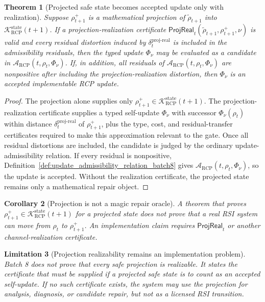 \documentclass[11pt]{article}
\newtheorem{theorem}{Theorem}[section]
\newtheorem{corollary}[theorem]{Corollary}
\newtheorem{limitation}[theorem]{Limitation}
\newcommand{\K}{\mathcal{K}}
\newcommand{\Acal}{\mathcal{A}}
\newcommand{\1}{\mathbf{1}}
\newcommand{\RCP}{\mathrm{RCP}}
\newcommand{\state}{\mathrm{state}}
\providecommand{\proj}{\mathrm{proj}}
\providecommand{\real}{\mathrm{real}}
\begin{document}
\begin{theorem}[Projected safe state becomes accepted update only with realization]
\label{thm:projection_realization_accepted_update_batch8}
Suppose \(\rho_{t+1}^+\) is a mathematical projection of \(\widetilde\rho_{t+1}\) into \(\K_{\RCP}^{\state}(t+1)\). If a projection-realization certificate \(\mathsf{ProjReal}_t(\widetilde\rho_{t+1},\rho_{t+1}^+,\nu)\) is valid and every residual distortion induced by \(\delta_t^{\proj\mbox{-}\real}\) is included in the admissibility residuals, then the typed update \(\Phi_\nu\) may be evaluated as a candidate in \(\Acal_{\RCP}(t,\rho_t,\Phi_\nu)\). If, in addition, all residuals of \(\Acal_{\RCP}(t,\rho_t,\Phi_\nu)\) are nonpositive after including the projection-realization distortion, then \(\Phi_\nu\) is an accepted implementable RCP update.
\end{theorem}

\begin{proof}
The projection alone supplies only \(\rho_{t+1}^+\in\K_{\RCP}^{\state}(t+1)\). The projection-realization certificate supplies a typed self-update \(\Phi_\nu\) with successor \(\Phi_\nu(\rho_t)\) within distance \(\delta_t^{\proj\mbox{-}\real}\) of \(\rho_{t+1}^+\), plus the type, cost, and residual-transfer certificates required to make this approximation relevant to the gate. Once all residual distortions are included, the candidate is judged by the ordinary update-admissibility relation. If every residual is nonpositive, Definition~\ref{def:update_admissibility_relation_batch8} gives \(\Acal_{\RCP}(t,\rho_t,\Phi_\nu)\), so the update is accepted. Without the realization certificate, the projected state remains only a mathematical repair object.
\end{proof}

\begin{corollary}[Projection is not a magic repair oracle]
\label{cor:projection_not_magic_oracle_batch8}
A theorem that proves \(\rho_{t+1}^+\in\K_{\RCP}^{\state}(t+1)\) for a projected state does not prove that a real RSI system can move from \(\rho_t\) to \(\rho_{t+1}^+\). An implementation claim requires \(\mathsf{ProjReal}_t\) or another channel-realization certificate.
\end{corollary}

\begin{limitation}[Projection realizability remains an implementation problem]
Batch 8 does not prove that every safe projection is realizable. It states the certificate that must be supplied if a projected safe state is to count as an accepted self-update. If no such certificate exists, the system may use the projection for analysis, diagnosis, or candidate repair, but not as a licensed RSI transition.
\end{limitation}
\end{document}
